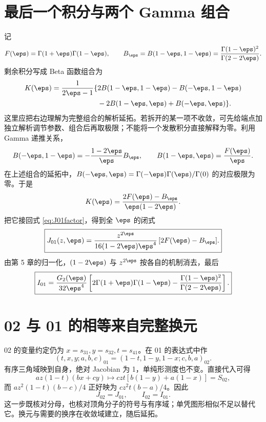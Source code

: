 \section{最后一个积分与两个 Gamma 组合}
记
\begin{equation}
F(\eps)=\Gamma(1+\eps)\Gamma(1-\eps),\qquad
B_\eps=B(1-\eps,1-\eps)
=\frac{\Gamma(1-\eps)^2}{\Gamma(2-2\eps)}.
\end{equation}
剩余积分写成 Beta 函数组合为
\begin{equation}
\begin{aligned}
K(\eps)=\frac1{2\eps-1}\{&2B(1-\eps,1-\eps)-B(-\eps,1-\eps)\\
&-2B(1-\eps,\eps)+B(-\eps,\eps)\}.
\end{aligned}
\end{equation}
这里应把右边理解为完整组合的解析延拓。若拆开的某一项不收敛，可先给端点加独立解析调节参数、组合后再取极限；不能将一个发散积分直接解释为零。利用 Gamma 递推关系，
\begin{equation}
B(-\eps,1-\eps)=-\frac{1-2\eps}{\eps}B_\eps,
\qquad B(1-\eps,\eps)=\frac{F(\eps)}\eps.
\end{equation}
在上述组合的延拓中，$B(-\eps,\eps)=\Gamma(-\eps)\Gamma(\eps)/\Gamma(0)$ 的对应极限为零。于是
\[
K(\eps)=\frac{2F(\eps)-B_\eps}{\eps(1-2\eps)}.
\]
把它接回式 \eqref{eq:J01factor}，得到全 $\eps$ 的闭式
\begin{equation}
\boxed{J_{01}(z,\eps)=
\frac{z^{2\eps}}{16(1-2\eps)\eps^4}\,[2F(\eps)-B_\eps].}
\label{eq:J01closed}
\end{equation}
由第 5 章的归一化，$(1-2\eps)$ 与 $z^{2\eps}$ 按各自的机制消去，最后
\begin{equation}
\boxed{I_{01}=\frac{G_2(\eps)}{32\eps^4}
\left[2\Gamma(1+\eps)\Gamma(1-\eps)
-\frac{\Gamma(1-\eps)^2}{\Gamma(2-2\eps)}\right].}
\label{eq:I01closed}
\end{equation}

\section{02 与 01 的相等来自完整换元}
02 的变量约定仍为 $x=s_{31},y=s_{32},t=s_{41}$。在 01 的表达式中作
\begin{equation}
(t,x,y;a,b,c)_{01}=(1-t,1-y,1-x;c,b,a)_{02}.
\end{equation}
有序三角域映到自身，绝对 Jacobian 为 1，单纯形测度也不变。直接代入可得
\[
az(1-t)(bx+cy)\longmapsto czt[b(1-y)+a(1-x)]=S_{02},
\]
而 $az^2(1-t)(b-c)/4$ 正好映为 $cz^2t(b-a)/4$。因此
\begin{equation}
J_{02}=J_{01},\qquad I_{02}=I_{01}.
\end{equation}
这一步既核对分母，也核对顶角分子的符号与有序域；单凭图形相似不足以替代它。换元与需要的换序在收敛域建立，随后延拓。

